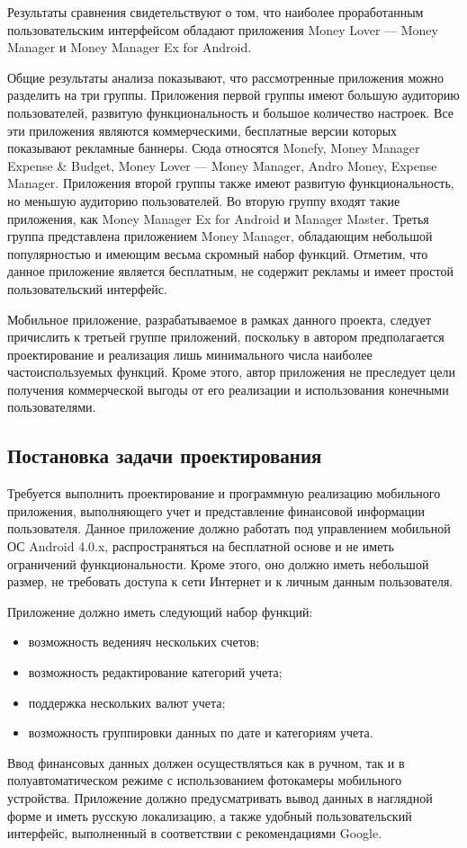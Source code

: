 Результаты сравнения свидетельствуют о том, что наиболее проработанным
пользовательским интерфейсом обладают приложения
Money Lover --- Money Manager и Money Manager Ex for Android.

Общие результаты анализа показывают, что рассмотренные приложения
можно разделить на три группы.
Приложения первой группы имеют большую аудиторию пользователей,
развитую функциональность и большое количество настроек.
Все эти приложения являются коммерческими,
бесплатные версии которых показывают рекламные баннеры.
Сюда относятся Monefy, Money Manager Expense \& Budget,
Money Lover --- Money Manager, Andro Money, Expense Manager.
Приложения второй группы также имеют развитую функциональность,
но меньшую аудиторию пользователей.
Во вторую группу входят такие приложения, как
Money Manager Ex for Android и Manager Master.
Третья группа представлена приложением Money Manager,
обладающим небольшой популярностью и имеющим весьма скромный набор функций.
Отметим, что данное приложение является бесплатным,
не содержит рекламы и имеет простой пользовательский интерфейс.

Мобильное приложение, разрабатываемое в рамках данного проекта,
следует причислить к третьей группе приложений,
поскольку в автором предполагается проектирование и реализация лишь
минимального числа наиболее частоиспользуемых функций.
Кроме этого, автор приложения не преследует цели получения
коммерческой выгоды от его реализации и использования конечными пользователями.

\subsection{Постановка задачи проектирования}
\label{subsec:system_spec_task}

Требуется выполнить проектирование и
программную реализацию мобильного приложения, выполняющего учет и представление
финансовой информации пользователя.
Данное приложение должно работать под управлением мобильной ОС Android 4.0.x,
распространяться на бесплатной основе и не иметь ограничений функциональности.
Кроме этого, оно должно иметь небольшой размер, не требовать доступа к сети Интернет
и к личным данным пользователя.

Приложение должно иметь следующий набор функций:
\begin{itemize}
  \item возможность веденияч нескольких счетов;
  \item возможность редактирование категорий учета;
  \item поддержка нескольких валют учета;
  \item возможность группировки данных по дате и категориям учета.
\end{itemize}
Ввод финансовых данных должен осуществляться как в ручном,
так и в полуавтоматическом режиме с использованием фотокамеры мобильного устройства.
Приложение должно предусматривать вывод данных в наглядной форме и иметь
русскую локализацию, а также удобный пользовательский интерфейс,
выполненный в соответствии с рекомендациями Google.
